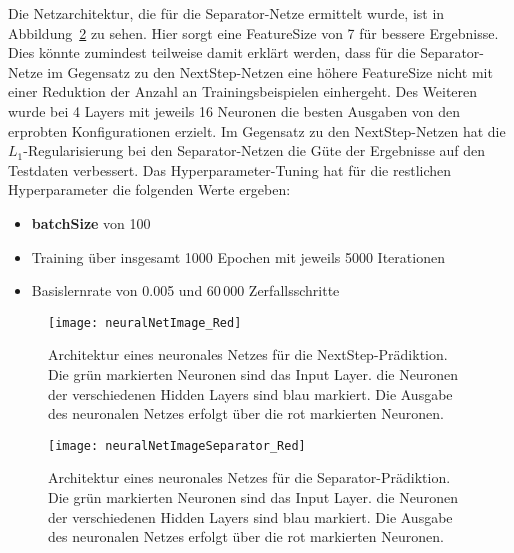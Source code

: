 Die Netzarchitektur, die für die Separator-Netze  ermittelt wurde, ist in Abbildung~\ref{fig:netArchitectureSep} zu sehen.
Hier sorgt eine FeatureSize von 7 für bessere Ergebnisse.
Dies könnte zumindest teilweise damit erklärt werden, dass für die Separator-Netze im Gegensatz zu den NextStep-Netzen eine höhere FeatureSize nicht mit einer Reduktion der Anzahl an Trainingsbeispielen einhergeht.
Des Weiteren wurde bei 4 Layers mit jeweils 16 Neuronen die besten Ausgaben von den erprobten Konfigurationen erzielt.
Im Gegensatz zu den NextStep-Netzen hat die \(L_1\)-Regularisierung bei den Separator-Netzen die Güte der Ergebnisse auf den Testdaten verbessert.  
Das Hyperparameter-Tuning hat für die restlichen Hyperparameter die folgenden Werte ergeben:
\begin{itemize}
    \item {\sffamily \textbf{batchSize}} von 100
    \item Training über insgesamt 1000 Epochen mit jeweils 5000 Iterationen
    \item Basislernrate von 0.005 und 60\,000 Zerfallsschritte
\end{itemize}

% 

\begin{figure}[p]
    \centering
	\texttt{[image: neuralNetImage\_Red]}
    \caption[Architektur eines neuronales Netzes für die NextStep-Prädiktion]
    {Architektur eines neuronales Netzes für die NextStep-Prädiktion. Die grün markierten Neuronen sind das Input Layer.
    die Neuronen der verschiedenen Hidden Layers sind blau markiert. Die Ausgabe des neuronalen Netzes erfolgt über die rot markierten Neuronen.}
	\label{fig:netArchitectureNextStep}
\end{figure}

\begin{figure}[p]
    \centering
	\texttt{[image: neuralNetImageSeparator\_Red]}
    \caption[Architektur eines neuronales Netzes für die Separator-Prädiktion]
    {Architektur eines neuronales Netzes für die Separator-Prädiktion. Die grün markierten Neuronen sind das Input Layer.
    die Neuronen der verschiedenen Hidden Layers sind blau markiert. Die Ausgabe des neuronalen Netzes erfolgt über die rot markierten Neuronen.}
	\label{fig:netArchitectureSep}
\end{figure}


